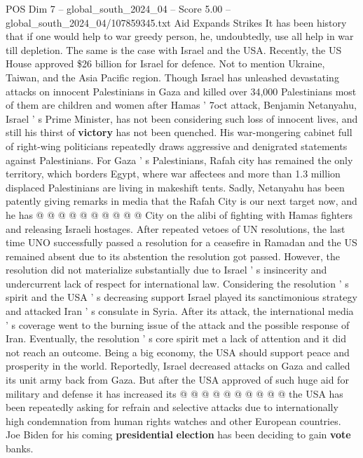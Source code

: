 \begin{textsample}{POS Dim 7 – global\_south\_2024\_04 – Score 5.00 – global\_south\_2024\_04/107859345.txt}  \label{ex:f7_pos_175}
Aid Expands Strikes It has been history that if one would help to war greedy person, he, undoubtedly, use all help in war till depletion.
The same is the case with Israel and the USA.
Recently, the US House approved \$26 billion for Israel for defence.
Not to mention Ukraine, Taiwan, and the Asia Pacific region.
Though Israel has unleashed devastating attacks on innocent Palestinians in Gaza and killed over 34,000 Palestinians most of them are children and women after Hamas ' 7oct attack, Benjamin Netanyahu, Israel ' s Prime Minister, has not been considering such loss of innocent lives, and still his thirst of \textbf{victory} has not been quenched.
His war-mongering cabinet full of right-wing politicians repeatedly draws aggressive and denigrated statements against Palestinians.
For Gaza ' s Palestinians, Rafah city has remained the only territory, which borders Egypt, where war affectees and more than 1.3 million displaced Palestinians are living in makeshift tents.
Sadly, Netanyahu has been patently giving remarks in media that the Rafah City is our next target now, and he has @ @ @ @ @ @ @ @ @ @ City on the alibi of fighting with Hamas fighters and releasing Israeli hostages.
After repeated vetoes of UN resolutions, the last time UNO successfully passed a resolution for a ceasefire in Ramadan and the US remained absent due to its abstention the resolution got passed.
However, the resolution did not materialize substantially due to Israel ' s insincerity and undercurrent lack of respect for international law.
Considering the resolution ' s spirit and the USA ' s decreasing support Israel played its sanctimonious strategy and attacked Iran ' s consulate in Syria.
After its attack, the international media ' s coverage went to the burning issue of the attack and the possible response of Iran.
Eventually, the resolution ' s core spirit met a lack of attention and it did not reach an outcome.
Being a big economy, the USA should support peace and prosperity in the world.
Reportedly, Israel decreased attacks on Gaza and called its unit army back from Gaza.
But after the USA approved of such huge aid for military and defense it has increased its @ @ @ @ @ @ @ @ @ @ the USA has been repeatedly asking for refrain and selective attacks due to internationally high condemnation from human rights watches and other European countries.
Joe Biden for his coming \textbf{presidential} \textbf{election} has been deciding to gain \textbf{vote} banks.

\end{textsample}
